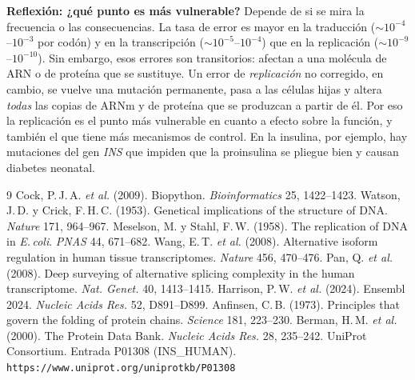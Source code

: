 \documentclass[11pt,a4paper]{article}
\newcommand{\sq}[1]{\texttt{#1}}
\begin{document}
\textbf{Reflexión: ¿qué punto es más vulnerable?} Depende de si se mira la frecuencia o las consecuencias. La tasa de error es mayor en la traducción ($\sim10^{-4}$--$10^{-3}$ por codón) y en la transcripción ($\sim10^{-5}$--$10^{-4}$) que en la replicación ($\sim10^{-9}$--$10^{-10}$). Sin embargo, esos errores son transitorios: afectan a una molécula de ARN o de proteína que se sustituye. Un error de \emph{replicación} no corregido, en cambio, se vuelve una mutación permanente, pasa a las células hijas y altera \emph{todas} las copias de ARNm y de proteína que se produzcan a partir de él. Por eso la replicación es el punto más vulnerable en cuanto a efecto sobre la función, y también el que tiene más mecanismos de control. En la insulina, por ejemplo, hay mutaciones del gen \textit{INS} que impiden que la proinsulina se pliegue bien y causan diabetes neonatal.

\small
\begin{thebibliography}{9}\setlength{\itemsep}{0pt}
 Cock, P.\,J.\,A. \textit{et al.} (2009). Biopython. \textit{Bioinformatics} 25, 1422--1423.
 Watson, J.\,D. y Crick, F.\,H.\,C. (1953). Genetical implications of the structure of DNA. \textit{Nature} 171, 964--967.
 Meselson, M. y Stahl, F.\,W. (1958). The replication of DNA in \textit{E.\,coli}. \textit{PNAS} 44, 671--682.
 Wang, E.\,T. \textit{et al.} (2008). Alternative isoform regulation in human tissue transcriptomes. \textit{Nature} 456, 470--476.
 Pan, Q. \textit{et al.} (2008). Deep surveying of alternative splicing complexity in the human transcriptome. \textit{Nat. Genet.} 40, 1413--1415.
 Harrison, P.\,W. \textit{et al.} (2024). Ensembl 2024. \textit{Nucleic Acids Res.} 52, D891--D899.
 Anfinsen, C.\,B. (1973). Principles that govern the folding of protein chains. \textit{Science} 181, 223--230.
 Berman, H.\,M. \textit{et al.} (2000). The Protein Data Bank. \textit{Nucleic Acids Res.} 28, 235--242.
 UniProt Consortium. Entrada P01308 (INS\_HUMAN). \sq{https://www.uniprot.org/uniprotkb/P01308}
\end{thebibliography}
\end{document}
